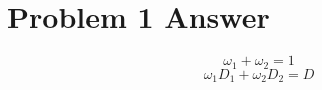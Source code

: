 \documentclass{article}
\begin{document}
    \section*{Problem 1 Answer}
    \begin{equation}
        \omega_{1} + \omega_{2} = 1
    \end{equation}
    \begin{equation}
        \omega_{1}D_{1}+\omega_{2}D_{2} = D
    \end{equation}
\end{document}

